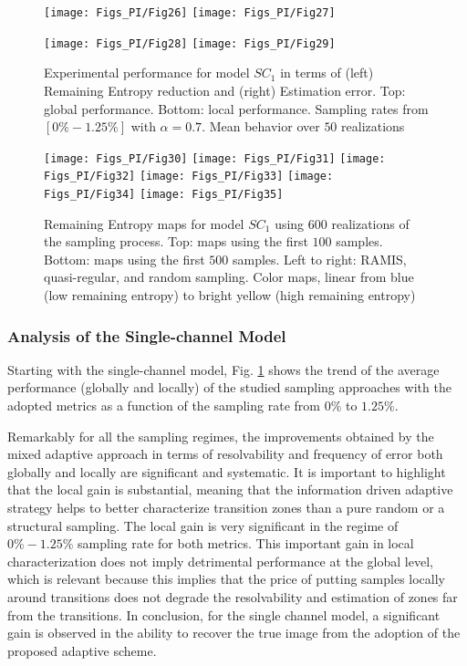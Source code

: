 \begin{figure}[!ht]
    \centering
    \texttt{[image: Figs\_PI/Fig26]}
    \texttt{[image: Figs\_PI/Fig27]}
    
    \texttt{[image: Figs\_PI/Fig28]}
    \texttt{[image: Figs\_PI/Fig29]}
	\caption[Experimental performance for model $SC_1$ ]{\label{fig:PerfModel1_PI} Experimental performance for model $SC_1$ in terms of (left) Remaining Entropy reduction and (right) Estimation error. Top: global performance. Bottom: local performance. Sampling rates from $[0\% - 1.25\%]$ with $\alpha = 0.7$. Mean behavior over $50$ realizations}
\end{figure}
\begin{figure}[!ht]
    \centering
    \texttt{[image: Figs\_PI/Fig30]}
    \texttt{[image: Figs\_PI/Fig31]}
    \texttt{[image: Figs\_PI/Fig32]}
    \texttt{[image: Figs\_PI/Fig33]}
    \texttt{[image: Figs\_PI/Fig34]}
    \texttt{[image: Figs\_PI/Fig35]}
	\caption[Remaining Entropy maps for model $SC_1$]{\label{fig:PerfModel1_3_PI} Remaining Entropy maps for model $SC_1$ using $600$ realizations of the sampling process. Top: maps using the first $100$ samples.  Bottom: maps using the first $500$ samples. Left to right: RAMIS, quasi-regular, and random sampling. Color maps, linear from blue (low remaining entropy) to bright yellow (high remaining entropy)}
\end{figure}

\subsubsection{Analysis of the Single-channel Model}
Starting with the single-channel model, Fig. \ref{fig:PerfModel1_PI} shows the trend of the average performance (globally and locally) of the studied sampling approaches with the adopted metrics as a function of the sampling rate from $0	\%$ to $1.25 \%$. 
 
Remarkably for all the sampling regimes, the improvements obtained by the mixed adaptive approach in terms of resolvability and frequency of error both globally and locally are significant and systematic.  It is important to highlight that the local gain is substantial, meaning that the information driven adaptive strategy helps to better characterize transition zones than a pure random or a structural sampling. The local gain is very significant in the regime of $0\%-1.25\%$  sampling rate for both metrics.  This important gain in local characterization does not imply detrimental performance at the global level, which is relevant because this implies that the price of putting samples locally around transitions does not degrade the resolvability and estimation of zones far from the transitions. In conclusion, for the single channel model, a significant gain is observed in the ability to recover the true image from the adoption of the proposed adaptive scheme.

